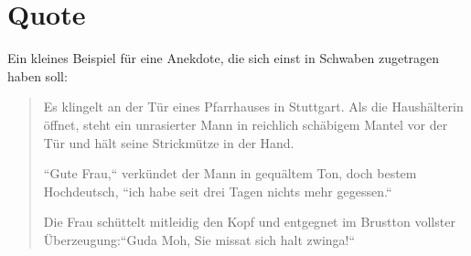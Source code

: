 \section{Quote}
	Ein kleines Beispiel für eine Anekdote, die sich einst in Schwaben zugetragen haben soll:
\begin{quote}
	Es klingelt an der Tür eines Pfarrhauses in Stuttgart. Als die Haushälterin öffnet, steht ein unrasierter Mann in reichlich schäbigem Mantel vor der Tür und hält seine Strickmütze in der Hand.
	
	``Gute Frau,`` verkündet der Mann in gequältem Ton, doch bestem Hochdeutsch, ``ich habe seit drei Tagen nichts mehr gegessen.``
	
	Die Frau schüttelt mitleidig den Kopf und entgegnet im Brustton vollster Überzeugung:``Guda Moh, Sie missat sich halt zwinga!``
\end{quote}


